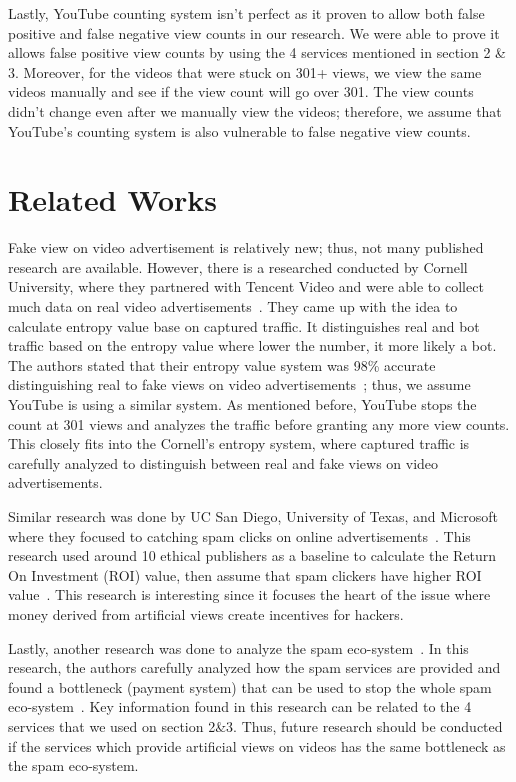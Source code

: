 \documentclass[conference]{IEEEtran}
\begin{document}
Lastly, YouTube counting system isn’t perfect as it proven to allow both false positive and false negative view counts in our research. We were able to prove it allows false positive view counts by using the 4 services mentioned in section 2 \& 3. Moreover, for the videos that were stuck on 301+ views, we view the same videos manually and see if the view count will go over 301. The view counts didn’t change even after we manually view the videos; therefore, we assume that YouTube’s counting
system is also vulnerable to false negative view counts.

\section{Related Works}

Fake view on video advertisement is relatively new; thus, not many published research are available. However, there is a researched conducted by Cornell University, where they partnered with Tencent Video and were able to collect much data on real video advertisements~\cite{c5}. They came up with the idea to calculate entropy value base on captured traffic. It distinguishes real and bot traffic based on the entropy value where lower the number, it more likely a bot. The authors stated that
their entropy value system was 98\% accurate distinguishing real to fake views on video advertisements~\cite{c5}; thus, we assume YouTube is using a similar system. As mentioned before, YouTube stops the count at 301 views and analyzes the traffic before granting any more view counts. This closely fits into the Cornell’s entropy system, where captured traffic is carefully analyzed to distinguish between real and fake views on video advertisements.

Similar research was done by UC San Diego, University of Texas, and Microsoft where they focused to catching spam clicks on online advertisements~\cite{c18}. This research used around 10 ethical publishers as a baseline to calculate the Return On Investment (ROI) value, then assume that spam clickers have higher ROI value~\cite{c18}. This research is interesting since it focuses the heart of the issue where money derived from artificial views create incentives for hackers.

Lastly, another research was done to analyze the spam eco-system~\cite{c18}. In this research, the authors carefully analyzed how the spam services are provided and found a bottleneck (payment system) that can be used to stop the whole spam eco-system~\cite{c18}. Key information found in this research can be related to the 4 services that we used on section 2\&3. Thus, future research should be conducted if the services which provide artificial views on videos has the same bottleneck as the
spam eco-system.
\end{document}

